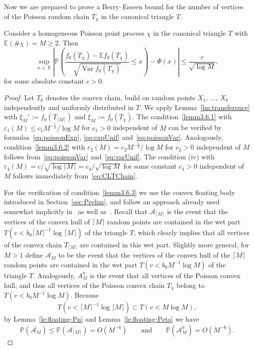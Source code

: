 \documentclass[AHL,Unicode,longabstracts,published]{cedram}
\newcommand{\var}{\operatorname{Var}}
\newcommand{\bbR}{\mathbb{R}}
\newcommand{\bbE}{\mathbb{E}}
\newcommand{\bbP}{\mathbb{P}}
\newcommand{\clA}{\mathcal{A}}
\begin{document}
Now we are prepared to prove a Berry--Esseen bound for the number of vertices of the Poisson random chain $T_\chi$ in the canonical triangle $T$.

\begin{lemm}\label{lm:BerryEssenPoissonChain}
Consider a homogeneous Poisson point process $\chi$ in the canonical triangle $T$ with $\bbE(\# \chi)=M \geq 2$. Then
\[
\sup_{x\,\in\,\bbR}\left|\bbP\left(\frac{f_0(T_\chi)-\bbE f_0(T_\chi)}{\sqrt{\var f_0(T_\chi)}}\leq x\right)-\Phi(x)\right|\leq \frac{c}{\sqrt{\log M}},
\]
for some absolute constant $c>0$.
\end{lemm}

\begin{proof}
Let $T_k$ denotes the convex chain, build on random points $X_1,\,\ldots,\,X_k$ independently and uniformly distributed in $T$. We apply Lemma~\ref{lm:transference} with $\xi_M':=f_0(T_{\lceil M\rceil})$ and $\xi_M:=f_0(T_{\chi})$. The condition~\eqref{lemm3.6.1} with $\varepsilon_1(M) \leq c_1 M^{- \frac 12}/\log M$ for $c_1>0$ independent of $M$ can be verified by formulas~\eqref{eq:poissonExp}, \eqref{eq:expUnif} and~\eqref{eq:poissonVar}. Analogously, condition~\eqref{lemm3.6.2} with $\varepsilon_2(M)=c_2M^{- \frac 12}/\log M$ for $c_2>0$ independent of $M$ follows from~\eqref{eq:poissonVar} and~\eqref{eq:varUnif}. The condition (iv) with $\varepsilon_4(M)=c/\sqrt{\log \lceil M\rceil}=c_4/\sqrt{\log M}$ for some constant $c_4>0$ independent of $M$ follows immediately from~\eqref{eq:CLTChain}.

For the verification of condition~\eqref{lemm3.6.3} we use the convex floating body introduced in Section~\ref{sec:Prelim}, and follow an approach already used somewhat implicitly in~\cite{Gro88} as well as~\cite{Reitz05}. Recall that $\clA_{\lceil M \rceil}$ is the event that the vertices of the convex hull of ${\lceil M \rceil}$ random points are contained in the wet part $T(v< b_0 {\lceil M \rceil}^{-1}\log {\lceil M \rceil})$ of the triangle $T$, which clearly implies that all vertices of the convex chain $T_{\lceil M \rceil}$ are contained in this wet part. Slightly more general, for $M>1$ define $\clA_{M }$ to be the event that the vertices of the convex hull of the ${\lceil M \rceil}$ random points are contained in the wet part $T(v< b_0 {M}^{-1}\log {M})$ of the triangle $T$. Analogously, $A^\pi_M$ is the event that all vertices of the Poisson convex hull, and thus all vertices of the Poisson convex chain $T_{\chi}$ belong to $T(v< b_0 M^{-1}\log M)$. Because
\[
T\left(v < \lceil M \rceil^{-1} \log \lceil M \rceil\right) \subset T(v< M \log M),
\]
by Lemma~\ref{le:floating-Pn} and Lemma~\ref{le:floating-Peta} we have
\[
\bbP(\overline{\clA_{M}}) \leq \bbP(\overline{\clA_{\lceil M \rceil}}) = O\left(M^{-6}\right)\qquad\text{and}\qquad
\bbP(\overline{\clA^\pi_M}) = O\left(M^{-6}\right).
\]


\end{proof}
\end{document}
